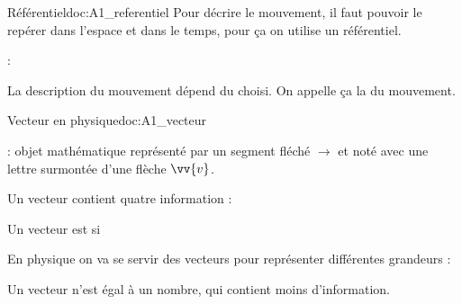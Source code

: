 \newpage
\vspace*{-34pt}
\begin{doc}{Référentiel}{doc:A1_referentiel}
  Pour décrire le mouvement, il faut pouvoir le repérer dans l’espace et dans le temps, pour ça on utilise un référentiel.
  
  \begin{importants}
     : 
  \end{importants}
  
  \begin{importants}
    La description du mouvement dépend du  choisi.
    On appelle ça la  du mouvement.
  \end{importants}
\end{doc}



\vspace*{-8pt}
\begin{doc}{Vecteur en physique}{doc:A1_vecteur}
  \begin{importants}
     : objet mathématique représenté par un segment fléché $\longrightarrow$ et noté avec une lettre surmontée d'une flèche $\vv{v}$.
    
    Un vecteur contient quatre information : 
    \begin{multicols}{2}
      \begin{listePoints}
        \item {}
        \item {}
        \item {}
        \item {}
      \end{listePoints}
    \end{multicols}
  
    Un vecteur est  si
  \end{importants}
  
  \fleche En physique on va se servir des vecteurs pour représenter différentes grandeurs :
  
  \attention Un vecteur n'est  égal à un nombre, qui contient moins d'information.
\end{doc}

